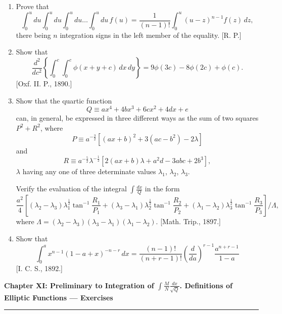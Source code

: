 \documentclass[11pt, a4paper]{article}
\newcommand{\source}[1]{\hfill\textnormal{[#1]}}
\begin{document}
\begin{enumerate}[leftmargin=2em]
\item Prove that
\[
\int_0^u du\int_0^u du\int_0^u du\dots\int_0^u du\,f(u)=\frac{1}{(n-1)!}\int_0^u(u-z)^{n-1}f(z)\,dz,
\]
there being $n$ integration signs in the left member of the equality. \source{R. P.}

\item Show that
\[
\frac{d^2}{dc^2}\left\{\int_0^c\int_0^c\phi(x+y+c)\,dx\,dy\right\}=9\phi(3c)-8\phi(2c)+\phi(c).
\]
\source{Oxf. II. P., 1890.}

\item Show that the quartic function
\[
Q\equiv ax^4+4bx^3+6cx^2+4dx+e
\]
can, in general, be expressed in three different ways as the sum of two squares $P^2+R^2$, where
\[
P\equiv a^{-\frac32}\left[(ax+b)^2+3(ac-b^2)-2\lambda\right]
\]
and
\[
R\equiv a^{-\frac52}\lambda^{-\frac12}\left[2(ax+b)\lambda+a^2d-3abc+2b^3\right],
\]
$\lambda$ having any one of three determinate values $\lambda_1$, $\lambda_2$, $\lambda_3$.

Verify the evaluation of the integral $\displaystyle\int\frac{dx}{Q}$ in the form
\[
\frac{a^2}{4}\left[(\lambda_2-\lambda_3)\lambda_1^{\frac12}\tan^{-1}\frac{R_1}{P_1}+(\lambda_3-\lambda_1)\lambda_2^{\frac12}\tan^{-1}\frac{R_2}{P_2}+(\lambda_1-\lambda_2)\lambda_3^{\frac12}\tan^{-1}\frac{R_3}{P_3}\right]\Big/\Lambda,
\]
where $\Lambda=(\lambda_2-\lambda_3)(\lambda_3-\lambda_1)(\lambda_1-\lambda_2)$. \source{Math. Trip., 1897.}

\item Show that
\[
\int_0^ax^{n-1}(1-a+x)^{-n-r}\,dx=\frac{(n-1)!}{(n+r-1)!}\left(\frac{d}{da}\right)^{r-1}\frac{a^{n+r-1}}{1-a}
\]
\source{I. C. S., 1892.}

\end{enumerate}

\newpage

\begin{center}
    {\LARGE \bfseries \color{accent} Chapter XI: Preliminary to Integration of $\displaystyle\int\frac{M}{N}\frac{dx}{\sqrt{Q}}$. Definitions of Elliptic Functions --- Exercises}\\
    \vspace{0.2cm}
    {\color{accent}\rule{0.55\linewidth}{0.8pt}}
\end{center}
\vspace{0.35cm}

\providecommand{\sn}{\operatorname{sn}}
\providecommand{\cn}{\operatorname{cn}}
\providecommand{\dn}{\operatorname{dn}}
\providecommand{\tnn}{\operatorname{tn}}
\providecommand{\amp}{\operatorname{am}}
\end{document}
